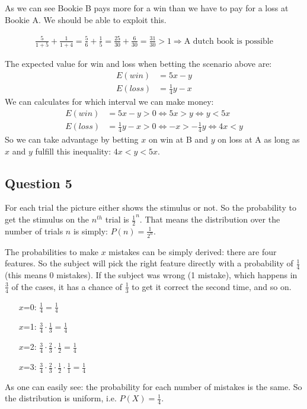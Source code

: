\documentclass[../main/Notes.tex]{subfiles}
\begin{document}
As we can see Bookie B pays more for a win than we have to pay for a loss at Bookie A. We should be able to exploit this.

\begin{align*}
\frac{5}{1+5}+\frac{1}{1+4} = \frac{5}{6} + \frac{1}{5} = \frac{25}{30} + \frac{6}{30} = \frac{31}{30} > 1 \Rightarrow \text{A dutch book is possible}
\end{align*}

The expected value for win and loss when betting the scenario above are:
\begin{align*}
E(win)  &= 5x-y \\
E(loss) &= \frac{1}{4}y-x
\end{align*}
We can calculates for which interval we can make money:
\begin{align*}
E(win)  &= 5x-y           > 0 \Leftrightarrow 5x>y             \Leftrightarrow y < 5x \\
E(loss) &= \frac{1}{4}y-x > 0 \Leftrightarrow -x>-\frac{1}{4}y \Leftrightarrow 4x < y
\end{align*}
So we can take advantage by betting $x$ on win at B and $y$ on loss at A as long as $x$ and $y$ fulfill this inequality: $4x<y<5x$.



\subsection*{Question 5}
For each trial the picture either shows the stimulus or not. So the probability to get the stimulus on the $n^{th}$ trial is $\frac{1}{2}^n$.
That means the distribution over the number of trials $n$ is simply: $P(n) = \frac{1}{2^n}$.

The probabilities to make $x$ mistakes can be simply derived: there are four features. So the subject will pick the right feature directly with a probability of $\frac{1}{4}$ (this means 0 mistakes). If the subject was wrong (1 mistake), which happens in $\frac{3}{4}$ of the cases, it has a chance of $\frac{1}{3}$ to get it correct the second time, and so on.
\begin{enumerate}
	\item[$x$=0:] $\frac{1}{4} = \frac{1}{4}$ 
	\item[$x$=1:] $\frac{3}{4}\cdot\frac{1}{3} = \frac{1}{4}$ 
	\item[$x$=2:] $\frac{3}{4}\cdot\frac{2}{3}\cdot\frac{1}{2} = \frac{1}{4}$ 
	\item[$x$=3:] $\frac{3}{4}\cdot\frac{2}{3}\cdot\frac{1}{2}\cdot\frac{1}{1} = \frac{1}{4}$ 
\end{enumerate}
As one can easily see: the probability for each number of mistakes is the same. So the distribution is uniform, i.e. $P(X) = \frac{1}{4}$.
\end{document}
